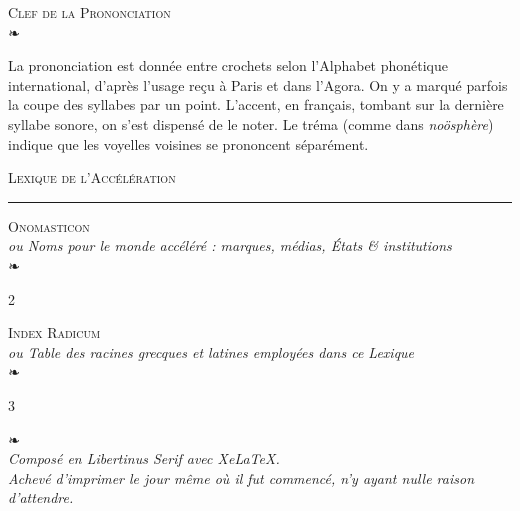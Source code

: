 \documentclass[10pt,twoside]{article}
\begin{document}
\vspace{3mm}
\begin{center}
{\dispfont\large\scshape Clef de la Prononciation}\\[2pt]
{\color{rubric}❧}
\end{center}
{\footnotesize
La prononciation est donnée entre crochets selon l'Alphabet phonétique international, d'après l'usage reçu à Paris et dans l'Agora. On y a marqué parfois la coupe des syllabes par un point. L'accent, en français, tombant sur la dernière syllabe sonore, on s'est dispensé de le noter. Le tréma (comme dans \textit{noösphère}) indique que les voyelles voisines se prononcent séparément.\par}

\clearpage

\pagestyle{dict}
\setcounter{page}{1}
\fontsize{8.3}{9.5}\selectfont
\begin{center}
{\dispfont\LARGE\scshape Lexique de l'Accélération}\\[3pt]
{\color{rubric}\rule{0.4\textwidth}{0.4pt}}
\end{center}
\vspace{1mm}



\clearpage
\begin{center}
{\dispfont\Large\scshape Onomasticon}\\[1pt]
{\itshape\small ou Noms pour le monde accéléré : marques, médias, États \& institutions}\\[2pt]
{\color{rubric}❧}
\end{center}
\begin{multicols}{2}
\footnotesize\raggedright

\end{multicols}

\clearpage
\begin{center}
{\dispfont\Large\scshape Index Radicum}\\[1pt]
{\itshape\small ou Table des racines grecques et latines employées dans ce Lexique}\\[2pt]
{\color{rubric}❧}
\end{center}
\begin{multicols}{3}
\scriptsize\raggedright

\end{multicols}

\vfill
\begin{center}
{\color{rubric}❧}\\[4pt]
{\footnotesize\itshape
Composé en Libertinus Serif avec Xe\LaTeX.\\
Achevé d'imprimer le jour même où il fut commencé, n'y ayant nulle raison d'attendre.}
\end{center}
\end{document}
